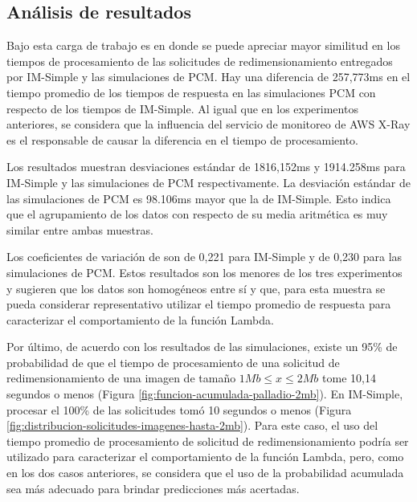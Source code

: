 \subsection{Análisis de resultados}
Bajo esta carga de trabajo es en donde se puede apreciar mayor similitud en los tiempos de procesamiento de las solicitudes de redimensionamiento entregados por IM-Simple y las simulaciones de PCM. Hay una diferencia de 257,773ms en el tiempo promedio de los tiempos de respuesta en las simulaciones PCM con respecto de los tiempos de IM-Simple. Al igual que en los experimentos anteriores, se considera que la influencia del servicio de monitoreo de AWS X-Ray es el responsable de causar la diferencia en el tiempo de procesamiento.

Los resultados muestran desviaciones estándar de 1816,152ms y 1914.258ms para IM-Simple y las simulaciones de PCM respectivamente. La desviación estándar de las simulaciones de PCM es 98.106ms mayor que la de IM-Simple. Esto indica que el agrupamiento de los datos con respecto de su media aritmética es muy similar entre ambas muestras.

Los coeficientes de variación de son de 0,221 para IM-Simple y de 0,230 para las simulaciones de PCM. Estos resultados son los menores de los tres experimentos y sugieren que los datos son homogéneos entre sí y que, para esta muestra se pueda considerar representativo utilizar el tiempo promedio de respuesta para caracterizar el comportamiento de la función Lambda.


Por último, de acuerdo con los resultados de las simulaciones, existe un 95\% de probabilidad de que el tiempo de procesamiento de una solicitud de redimensionamiento de una imagen de tamaño $1Mb \leq x \leq 2Mb$ tome 10,14 segundos o menos (Figura \ref{fig:funcion-acumulada-palladio-2mb}). En IM-Simple, procesar el 100\% de las solicitudes tomó 10 segundos o menos (Figura \ref{fig:distribucion-solicitudes-imagenes-hasta-2mb}). Para este caso, el uso del tiempo promedio de procesamiento de solicitud de redimensionamiento podría ser utilizado para caracterizar el comportamiento de la función Lambda, pero, como en los dos casos anteriores, se considera que el uso de la probabilidad acumulada sea más adecuado para brindar predicciones más acertadas.

